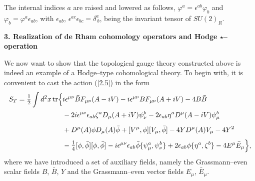 \documentclass[a4paper,11pt]{article}
\begin{document}
The internal indices $a$ are raised and lowered as follows,
$\varphi^a = \epsilon^{ab} \varphi_b$ and 
$\varphi_b = \varphi^a \epsilon_{ab}$, with $\epsilon_{ab}$, 
$\epsilon^{ac} \epsilon_{bc} = \delta^a_{~b}$, being the invariant tensor of 
$SU(2)_R$.
\bigskip
\begin{flushleft}
{\large{\bf 3. Realization of de Rham cohomology operators and 
Hodge $\star$--operation }}
\end{flushleft}
\bigskip
We now want to show that the topological gauge theory constructed above is 
indeed an example of a Hodge--type cohomological theory. To begin with, 
it is convenient to cast the action 
(\ref{2.5}) in the form
\begin{align}
\label{3.1}
S_T = \hbox{\large$\frac{1}{2}$} \int d^2x\, {\rm tr} \Bigr\{&
i \epsilon^{\mu\nu} \bar{B} F_{\mu\nu}(A - i V) - 
i \epsilon^{\mu\nu} B F_{\mu\nu}(A + i V) - 4 B \bar{B}
\nonumber
\\ 
& - 2 i \epsilon^{\mu\nu} \epsilon_{ab} \zeta^a D_\mu(A + i V) \psi_\nu^b - 
2 \epsilon_{ab} \eta^a D^\mu(A - i V) \psi_\mu^b 
\nonumber
\\
& + D^\mu(A) \phi D_\mu(A) \bar{\phi} + 
[ V^\mu, \phi ] [ V_\mu, \bar{\phi} ] - 
4 Y D^\mu(A) V_\mu - 4 Y^2
\phantom{\frac{1}{2}}
\nonumber
\\
& - \hbox{\large$\frac{1}{4}$} [ \phi, \bar{\phi} ] [ \phi, \bar{\phi} ] -
i \epsilon^{\mu\nu} \epsilon_{ab} \bar{\phi} \{ \psi_\mu^a, \psi_\nu^b \} +
2 \epsilon_{ab} \phi \{ \eta^a, \zeta^b \} - 
4 E^\mu \bar{E}_\mu \Bigr\},
\end{align}
where we have introduced a set of auxiliary fields, namely the Grassmann--even
scalar fields $B$, $\bar{B}$, $Y$ and the Grassmann--even vector fields
$E_\mu$, $\bar{E}_\mu$.
 
\end{document}
